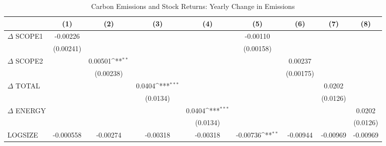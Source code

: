 \begin{table}[htbp]\centering
\def\sym#1{\ifmmode^{#1}\else\(^{#1}\)\fi}
\caption{Carbon Emissions and Stock Returns: Yearly Change in Emissions}
\begin{tabular}{l*{8}{c}}
\hline\hline
                    &\multicolumn{1}{c}{(1)}         &\multicolumn{1}{c}{(2)}         &\multicolumn{1}{c}{(3)}         &\multicolumn{1}{c}{(4)}         &\multicolumn{1}{c}{(5)}         &\multicolumn{1}{c}{(6)}         &\multicolumn{1}{c}{(7)}         &\multicolumn{1}{c}{(8)}         \\
\hline
$\Delta$ SCOPE1     &    -0.00226         &                     &                     &                     &    -0.00110         &                     &                     &                     \\
                    &   (0.00241)         &                     &                     &                     &   (0.00158)         &                     &                     &                     \\
$\Delta$ SCOPE2     &                     &     0.00501\sym{**} &                     &                     &                     &     0.00237         &                     &                     \\
                    &                     &   (0.00238)         &                     &                     &                     &   (0.00175)         &                     &                     \\
$\Delta$ TOTAL      &                     &                     &      0.0404\sym{***}&                     &                     &                     &      0.0202         &                     \\
                    &                     &                     &    (0.0134)         &                     &                     &                     &    (0.0126)         &                     \\
$\Delta$ ENERGY     &                     &                     &                     &      0.0404\sym{***}&                     &                     &                     &      0.0202         \\
                    &                     &                     &                     &    (0.0134)         &                     &                     &                     &    (0.0126)         \\
LOGSIZE             &   -0.000558         &    -0.00274         &    -0.00318         &    -0.00318         &    -0.00736\sym{**} &    -0.00944         &    -0.00969         &    -0.00969         \\

\end{tabular}
\end{table}
